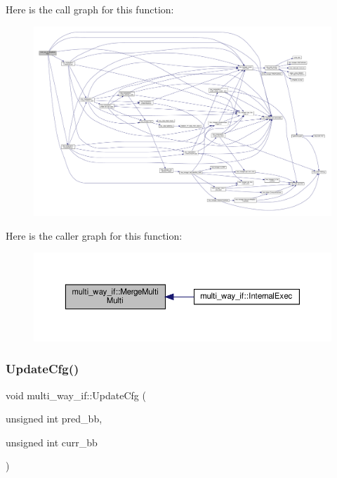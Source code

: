 Here is the call graph for this function\+:
\nopagebreak
\begin{figure}[H]
\begin{center}
\leavevmode
\includegraphics[width=350pt]{dd/dca/classmulti__way__if_a074fa69a22db0768c7e6b7f237ef38d7_cgraph}
\end{center}
\end{figure}
Here is the caller graph for this function\+:
\nopagebreak
\begin{figure}[H]
\begin{center}
\leavevmode
\includegraphics[width=350pt]{dd/dca/classmulti__way__if_a074fa69a22db0768c7e6b7f237ef38d7_icgraph}
\end{center}
\end{figure}
\mbox{\label{classmulti__way__if_acff7c7c7e90fbeabb45e4dec35ec9fa2}} 
\subsubsection{\texorpdfstring{Update\+Cfg()}{UpdateCfg()}}
{\footnotesize\ttfamily void multi\+\_\+way\+\_\+if\+::\+Update\+Cfg (\begin{DoxyParamCaption}\item[{unsigned int}]{pred\+\_\+bb,  }\item[{unsigned int}]{curr\+\_\+bb }\end{DoxyParamCaption})\hspace{0.3cm}{\ttfamily [private]}}



